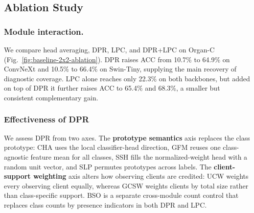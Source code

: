 \documentclass[journal,twoside,web]{ieeecolor}
\begin{document}


\subsection{Ablation Study}



\subsubsection{Module interaction.}
We compare head averaging, DPR, LPC, and DPR+LPC on Organ-C (Fig.~\ref{fig:baseline-2x2-ablation}). DPR raises ACC from 10.7\% to 64.9\% on ConvNeXt and 10.5\% to 66.4\% on Swin-Tiny, supplying the main recovery of diagnostic coverage. LPC alone reaches only 22.3\% on both backbones, but added on top of DPR it further raises ACC to 65.4\% and 68.3\%, a smaller but consistent complementary gain.



\subsubsection{Effectiveness of DPR}
We assess DPR from two axes. The \textbf{prototype semantics} axis replaces the class prototype: CHA uses the local classifier-head direction, GFM reuses one class-agnostic feature mean for all classes, SSH fills the normalized-weight head with a random unit vector, and SLP permutes prototypes across labels. The \textbf{client-support weighting} axis alters how observing clients are credited: UCW weights every observing client equally, whereas GCSW weights clients by total size rather than class-specific support. BSO is a separate cross-module count control that replaces class counts by presence indicators in both DPR and LPC.
\end{document}
